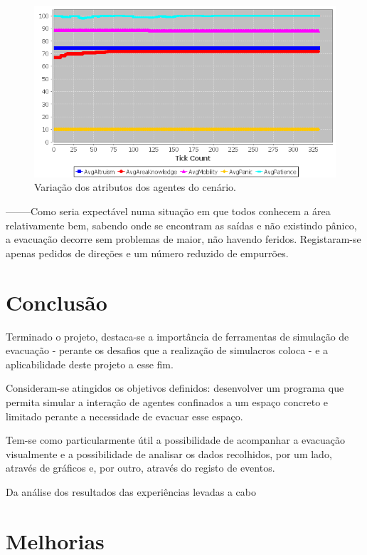 \documentclass[12pt]{article}
\begin{document}
\begin{titlepage}
\begin{itemize}
\begin{figure}[H]
	\centering
	\includegraphics{graph_sc1.png}
	\caption{Variação dos atributos dos agentes do cenário.}
	\label{graph_sc1}
\end{figure}

--------Como seria expectável numa situação em que todos conhecem a área relativamente bem, sabendo onde se encontram as saídas e não existindo pânico, a evacuação decorre sem problemas de maior, não havendo feridos. Registaram-se apenas pedidos de direções e um número reduzido de empurrões.

\end{itemize}
	
	

\newpage
\section{Conclusão}

Terminado o projeto, destaca-se a importância de ferramentas de simulação de evacuação - perante os desafios que a realização de simulacros coloca - e a aplicabilidade deste projeto a esse fim.

Consideram-se atingidos os objetivos definidos: desenvolver um programa que permita simular a interação de agentes confinados a um espaço concreto e limitado perante a necessidade de evacuar esse espaço.

Tem-se como particularmente útil a possibilidade de acompanhar a evacuação visualmente e a possibilidade de analisar os dados recolhidos, por um lado, através de gráficos e, por outro, através do registo de eventos.

Da análise dos resultados das experiências levadas a cabo

\section{Melhorias}


\end{titlepage}
\end{document}
